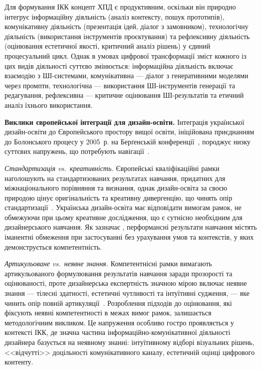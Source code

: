 Для формування ІКК концепт ХПД є продуктивним, оскільки він природно інтегрує інформаційну діяльність (аналіз контексту, пошук прототипів), комунікативну діяльність (презентація ідей, діалог з замовником), технологічну діяльність (використання інструментів проєктування) та рефлексивну діяльність (оцінювання естетичної якості, критичний аналіз рішень) у єдиний процесуальний цикл. Однак в умовах цифрової трансформації зміст кожного із цих видів діяльності суттєво змінюється: інформаційна діяльність включає взаємодію з ШІ-системами, комунікативна --- діалог з генеративними моделями через промпти, технологічна --- використання ШІ-інструментів генерації та редагування, рефлексивна --- критичне оцінювання ШІ-результатів та етичний аналіз їхнього використання.

\textbf{Виклики європейської інтеграції для дизайн-освіти.} Інтеграція української дизайн-освіти до Європейського простору вищої освіти, ініційована приєднанням до Болонського процесу у 2005~р. на Берґенській конференції~\cite{Bologna1999}, породжує низку суттєвих напружень, що потребують навігації~\cite{Musiienko2025DesignEducation, Castillo2011230}.

\emph{Стандартизація vs.\ креативність.} Європейські кваліфікаційні рамки наголошують на стандартизованих результатах навчання, придатних для міжнаціонального порівняння та визнання, однак дизайн-освіта за своєю природою цінує оригінальність та креативну дивергенцію, що чинять опір стандартизації~\cite{Weldon2009168}. Українська дизайн-освіта має відповідати вимогам рамок, не обмежуючи при цьому креативне дослідження, що є сутнісно необхідним для дизайнерського навчання. Як зазначає \citet{Brockmann200899}, перформансні результати навчання містять іманентні обмеження при застосуванні без урахування умов та контекстів, у яких демонструється компетентність.

\emph{Артикульоване vs.\ неявне знання.} Компетентнісні рамки вимагають артикульованого формулювання результатів навчання заради прозорості та оцінюваності, проте дизайнерська експертність значною мірою включає неявне знання --- тілесні здатності, естетичні чутливості та інтуїтивні судження, --- яке чинить опір повній артикуляції~\cite{Schon1983}. Розроблення підходів до оцінювання, які фіксують неявні компетентності в межах вимог рамок, залишається методологічним викликом. Це напруження особливо гостро проявляється у контексті ІКК, де значна частина інформаційно-комунікативної діяльності дизайнера базується на неявному знанні: інтуїтивному відборі візуальних рішень, <<відчутті>> доцільності комунікативного каналу, естетичній оцінці цифрового контенту.

